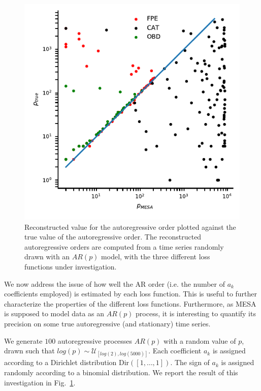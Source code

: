 \documentclass{aa}
\begin{document}
\begin{figure}
	\centering
	\includegraphics[width = \linewidth]{Images/arp_errors/scatter_deltap_ptrue}
	\caption{Reconstructed value for the autoregressive order plotted against the true value of the autoregressive order.
	The reconstructed autoregressive orders are computed from a time series randomly drawn with an $AR(p)$ model, with the three different loss functions under investigation.
	}
	\label{fig:p_vs_ptrue}
\end{figure}

We now address the issue of how well the AR order (i.e. the number of $a_k$ coefficients employed) is estimated by each loss function.
This is useful to further characterize the properties of the different loss functions. Furthermore, as MESA is supposed to model data as an $AR(p)$ process, it is interesting to quantify its precision on some true autoregressive (and stationary) time series.

We generate $100$ autoregressive processes $AR(p)$ with a random value of $p$, drawn such that $log(p) \sim\mathcal{U}_{[log(2), log(5000)]}$.
Each coefficient $a_k$ is assigned according to a Dirichlet distribution $\mathrm{Dir}([1,\hdots, 1])$. The sign of $a_k$ is assigned randomly according to a binomial distribution. We report the result of this investigation in Fig.~\ref{fig:p_vs_ptrue}.
\end{document}
